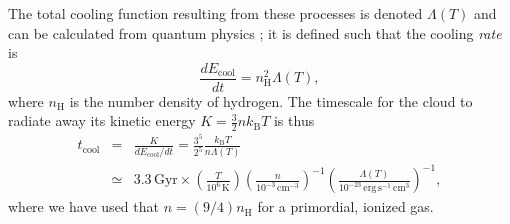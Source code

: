 \documentclass[useAMS]{aa}
\begin{document}
The total cooling function resulting from these processes is denoted $\Lambda(T)$ and can be calculated from quantum physics \citep[e.g.][]{Sutherland1993}; it is defined such that the cooling \emph{rate} is
\begin{equation}
    \label{eq:Lambda}
    \frac{dE_\mathrm{cool}}{dt} = n_\mathrm{H}^2 \Lambda(T),
\end{equation}
where $n_\mathrm{H}$ is the number density of hydrogen.
The timescale for the cloud to radiate away its kinetic energy $K = \frac{3}{2}n k_\mathrm{B}T$ is thus
\begin{eqnarray}
    \label{eq:tcool}
    t_\mathrm{cool} & = & \frac{K}{dE_\mathrm{cool}/dt}
    = \frac{3^5}{2^5}\frac{k_\mathrm{B}T}{n\Lambda(T)}\\
    & \simeq & 3.3\,\mathrm{Gyr}\times
    \left(\frac{T}{10^6\,\mathrm{K}}\right)
    \left(\frac{n}{10^{-3}\,\mathrm{cm}^{-3}}\right)^{-1}\!
    \left(\frac{\Lambda(T)}{10^{-23}\,\mathrm{erg}\,\mathrm{s}^{-1}\,\mathrm{cm}^3}\right)^{-1},
\end{eqnarray}
where we have used that $n = (9/4)n_\mathrm{H}$ for a primordial, ionized gas.
\end{document}

